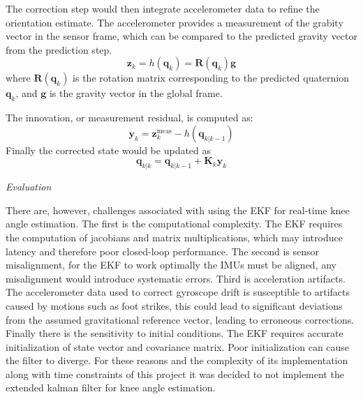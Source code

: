 The correction step would then integrate accelerometer data to refine the orientation estimate. The accelerometer provides a measurement of the grabity vector in the sensor frame, which can be compared to the predicted gravity vector from the prediction step.
\[
\mathbf{z}_k = h(\mathbf{q}_k) = \mathbf{R}(\mathbf{q}_k) \mathbf{g}
\]
where \( \mathbf{R}(\mathbf{q}_k) \) is the rotation matrix corresponding to the predicted quaternion \( \mathbf{q}_k \), and \( \mathbf{g} \) is the gravity vector in the global frame.

The innovation, or measurement residual, is computed as:
\[
\mathbf{y}_k = \mathbf{z}_k^{\text{meas}} - h(\mathbf{q}_{k|k-1})
\]
Finally the corrected state would be updated as 
\[
\mathbf{q}_{k|k} = \mathbf{q}_{k|k-1} + \mathbf{K}_k \mathbf{y}_k
\]




\textit{Evaluation}

There are, however, challenges associated with using the EKF for real-time knee angle estimation. The first is the computational complexity. The EKF requires the computation of jacobians and matrix multiplications, which may introduce latency and therefore poor closed-loop performance. The second is sensor misalignment, for the EKF to work optimally the IMUs must be aligned, any misalignment would introduce systematic errors. Third is acceleration artifacts. The accelerometer data used to correct gyroscope drift is susceptible to artifacts caused by motions such as foot strikes, this could lead to significant deviations from the assumed gravitational reference vector, leading to erroneous corrections. Finally there is the sensitivity to initial conditions. The EKF requires accurate initialization of state vector and covariance matrix. Poor initialization can cause the filter to diverge. For these reasons and the complexity of its implementation along with time constraints of this project it was decided to not implement the extended kalman filter for knee angle estimation.


